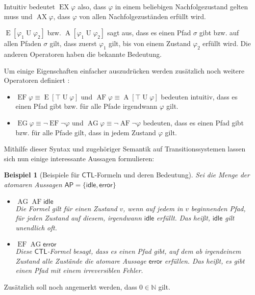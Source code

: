 \documentclass{lni}
\theoremstyle{def_style}
\theoremstyle{break}
\newtheorem{example}{Beispiel}
\newcommand{\AU}[2]{\operatorname{A}[#1\operatorname{U}#2]}
\newcommand{\EU}[2]{\operatorname{E}[#1\operatorname{U}#2]}
\newcommand{\CTL}{\mathsf{CTL}}
\begin{document}
Intuitiv bedeutet $\operatorname{EX}\varphi$ also, dass $\varphi$ in einem beliebigen Nachfolgezustand gelten muss und $\operatorname{AX}\varphi$, dass $\varphi$ von allen Nachfolgezuständen erfüllt wird.

$\EU{\varphi_1}{\varphi_2}$ bzw. $\AU{\varphi_1}{\varphi_2}$ sagt aus, dass es einen Pfad $\sigma$ gibt bzw. auf allen Pfaden $\sigma$ gilt, dass zuerst $\varphi_1$ gilt, bis von einem Zustand $\varphi_2$ erfüllt wird.
Die anderen Operatoren haben die bekannte Bedeutung.

Um einige Eigenschaften einfacher auszudrücken werden zusätzlich noch weitere Operatoren definiert \cite{clarke1982design}:
\begin{itemize}
	\item $\operatorname{EF}\varphi \equiv \EU{\top}{\varphi}$ und $\operatorname{AF}\varphi \equiv \AU{\top}{\varphi}$ bedeuten intuitiv, dass es einen Pfad gibt bzw. für alle Pfade irgendwann $\varphi$ gilt.
	\item $\operatorname{EG}\varphi \equiv \neg\operatorname{EF}\neg\varphi$ und $\operatorname{AG}\varphi \equiv \neg\operatorname{AF}\neg\varphi$ bedeuten, dass es einen Pfad gibt bzw. für alle Pfade gilt, dass in jedem Zustand $\varphi$ gilt.
\end{itemize}
Mithilfe dieser Syntax und zugehöriger Semantik auf Transitionssystemen lassen sich nun einige interessante Aussagen formulieren:
\begin{example}[Beispiele für $\CTL$-Formeln und deren Bedeutung]
	Sei die Menge der atomaren Aussagen $\mathsf{AP}=\{\mathsf{idle}, \mathsf{error}\}$
	\begin{itemize}
		\item $\operatorname{AG}\operatorname{AF}\mathsf{idle}$ \\ Die Formel gilt für einen Zustand $v$, wenn auf jedem in $v$ beginnenden Pfad, für jeden Zustand auf diesem, irgendwann $\mathsf{idle}$ erfüllt. Das heißt, $\mathsf{idle}$ gilt unendlich oft.
		\item $\operatorname{EF}\operatorname{AG}\mathsf{error}$ \\
		Diese $\CTL$-Formel besagt, dass es einen Pfad gibt, auf dem ab irgendeinem Zustand alle Zustände die atomare Aussage $\mathsf{error}$ erfüllen. Das heißt, es gibt einen Pfad mit einem irreversiblen Fehler.
	\end{itemize}
\end{example}

Zusätzlich soll noch angemerkt werden, dass $0\in \mathbb{N}$ gilt.
\end{document}
